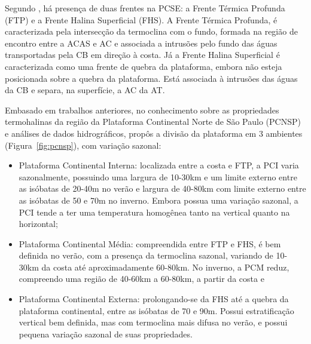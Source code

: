 \hspace{5mm} Segundo \cite{castro1996correntes}, há presença de duas frentes na PCSE: a Frente Térmica Profunda (FTP) e a Frente Halina Superficial (FHS). A Frente Térmica Profunda, é caracterizada pela intersecção da termoclina com o fundo, formada na região de encontro entre a ACAS e AC e associada a intrusões pelo fundo das águas transportadas pela CB em direção à costa. Já a Frente Halina Superficial é caracterizada como uma frente de quebra da plataforma, embora não esteja posicionada sobre a quebra da plataforma. Está associada à intrusões das águas da CB e separa, na superfície, a AC da AT.

\hspace{5mm} Embasado em trabalhos anteriores, no conhecimento sobre as propriedades termohalinas da região da Plataforma Continental Norte de São Paulo (PCNSP) e análises de dados hidrográficos, \cite{castro1996correntes} propôs a divisão da plataforma em 3 ambientes (Figura~\ref{fig:pcnsp}), com variação sazonal:

\begin{itemize}
    \item Plataforma Continental Interna: localizada entre a costa e FTP, a PCI varia sazonalmente, possuindo uma largura de 10-30km e um limite externo entre as isóbatas de 20-40m no verão e largura de 40-80km com limite externo entre as isóbatas de 50 e 70m no inverno. Embora possua uma variação sazonal, a PCI tende a ter uma temperatura homogênea tanto na vertical quanto na horizontal;
    \item Plataforma Continental Média: compreendida entre FTP e FHS, é bem definida no verão, com a presença da termoclina sazonal, variando de 10-30km da costa até aproximadamente 60-80km. No inverno, a PCM reduz, compreendo uma região de 40-60km a 60-80km, a partir da costa e
    \item Plataforma Continental Externa: prolongando-se da FHS até a quebra da plataforma continental, entre as isóbatas de 70 e 90m. Possui estratificação vertical bem definida, mas com termoclina mais difusa no verão, e possui pequena variação sazonal de suas propriedades.
\end{itemize}

